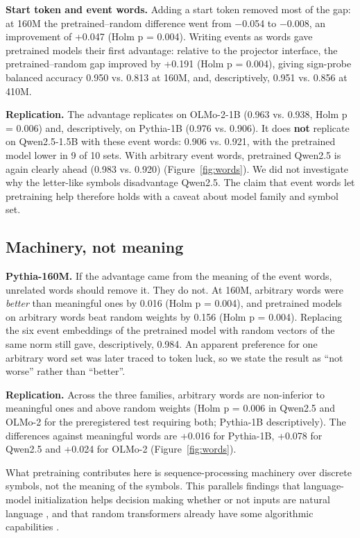 \documentclass[11pt]{article}
\begin{document}
\textbf{Start token and event words.} Adding a start token removed most of the gap: at 160M the pretrained--random difference went from $-$0.054 to $-$0.008, an improvement of +0.047 (Holm p = 0.004). Writing events as words gave pretrained models their first advantage: relative to the projector interface, the pretrained--random gap improved by +0.191 (Holm p = 0.004), giving sign-probe balanced accuracy 0.950 vs. 0.813 at 160M, and, descriptively, 0.951 vs. 0.856 at 410M.

\textbf{Replication.} The advantage replicates on OLMo-2-1B (0.963 vs. 0.938, Holm p = 0.006) and, descriptively, on Pythia-1B (0.976 vs. 0.906). It does \textbf{not} replicate on Qwen2.5-1.5B with these event words: 0.906 vs. 0.921, with the pretrained model lower in 9 of 10 sets. With arbitrary event words, pretrained Qwen2.5 is again clearly ahead (0.983 vs. 0.920) (Figure~\ref{fig:words}). We did not investigate why the letter-like symbols disadvantage Qwen2.5. The claim that event words let pretraining help therefore holds with a caveat about model family and symbol set.

\subsection{Machinery, not meaning}

\textbf{Pythia-160M.} If the advantage came from the meaning of the event words, unrelated words should remove it. They do not. At 160M, arbitrary words were \emph{better} than meaningful ones by 0.016 (Holm p = 0.004), and pretrained models on arbitrary words beat random weights by 0.156 (Holm p = 0.004). Replacing the six event embeddings of the pretrained model with random vectors of the same norm still gave, descriptively, 0.984. An apparent preference for one arbitrary word set was later traced to token luck, so we state the result as ``not worse'' rather than ``better''.

\textbf{Replication.} Across the three families, arbitrary words are non-inferior to meaningful ones and above random weights (Holm p = 0.006 in Qwen2.5 and OLMo-2 for the preregistered test requiring both; Pythia-1B descriptively). The differences against meaningful words are +0.016 for Pythia-1B, +0.078 for Qwen2.5 and +0.024 for OLMo-2 (Figure~\ref{fig:words}).

What pretraining contributes here is sequence-processing machinery over discrete symbols, not the meaning of the symbols. This parallels findings that language-model initialization helps decision making whether or not inputs are natural language \citep{li2022}, and that random transformers already have some algorithmic capabilities \citep{zhong2024}.
\end{document}
